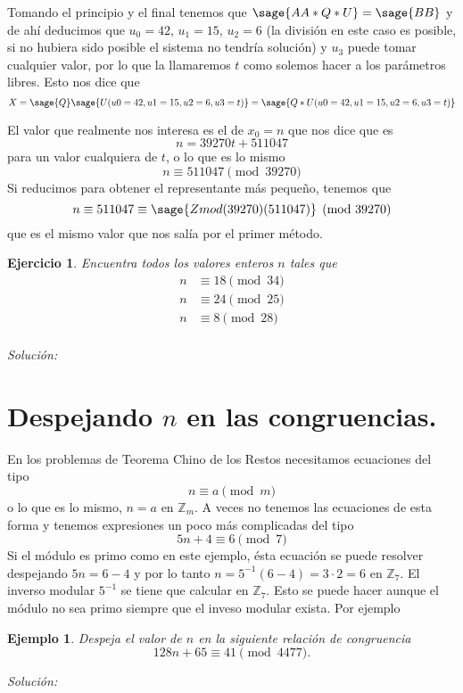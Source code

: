 \documentclass{amsart}
\newtheorem{ejer}{Ejercicio}
\newtheorem{ejem}{Ejemplo}
\begin{document}
Tomando el principio y el final tenemos que  $\sage{AA*Q*U} = \sage{BB}$
y de ahí deducimos que $u_0 = 42$, $u_1 = 15$, $u_2 = 6$ (la división en este caso
es posible, si no hubiera sido posible el sistema no tendría solución) y $u_3$
puede tomar cualquier valor, por lo que la llamaremos $t$ como solemos hacer a los
parámetros libres. Esto nos dice que 
$$ X = \sage{Q} \sage{U(u0=42,u1=15,u2=6,u3=t)} = \sage{Q*U(u0=42,u1=15,u2=6,u3=t)}$$

El valor que realmente nos interesa es el de $x_0 = n$ que nos dice que es
$$ n = 39270t + 511047$$
para un valor cualquiera de $t$, o lo que es lo mismo 
$$ n \equiv 511047 \pmod{39270}$$
Si reducimos para obtener el representante más pequeño, tenemos que 
$$ n \equiv 511047  \equiv \sage{Zmod(39270)(511047)} \pmod{39270}$$
que es el mismo valor que nos salía por el primer método.


\begin{ejer}
Encuentra todos los valores enteros $n$ tales que
\begin{align*}
n &\equiv 18 \pmod{34} \\
n &\equiv 24 \pmod{25} \\
n &\equiv 8 \pmod{28} \\
\end{align*}
\end{ejer}

{\it Solución: }



\section{Despejando $n$ en las congruencias.}

En los problemas de Teorema Chino de los Restos necesitamos ecuaciones del tipo 
$$ n \equiv a \pmod{m} $$
o lo que es lo mismo, $n = a$ en ${\mathbb Z}_m$. 
A veces no tenemos las ecuaciones de esta forma y tenemos expresiones
un poco más complicadas del tipo 
$$ 5n+4 \equiv 6 \pmod{7}$$
Si el módulo es primo como en este ejemplo, ésta ecuación se puede resolver
despejando $5n = 6-4$ y por lo tanto $n = 5^{-1} (6-4) = 3\cdot 2 = 6$ en 
${\mathbb Z}_7$. El inverso modular $5^{-1}$ se tiene que calcular en 
${\mathbb Z}_7$. Esto se puede hacer aunque el módulo no sea primo 
siempre que el inveso modular exista. Por ejemplo

\begin{ejem}
Despeja el valor de $n$ en la siguiente relación de congruencia
$$ 128n + 65 \equiv 41 \pmod{4477}. $$
\end{ejem}
{\it Solución: }
\end{document}
